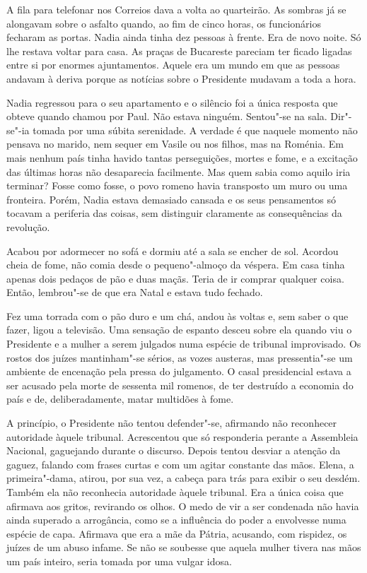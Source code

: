 A fila para telefonar nos Correios dava a volta ao quarteirão. As
sombras já se alongavam sobre o asfalto quando, ao fim de cinco horas,
os funcionários fecharam as portas. Nadia ainda tinha dez pessoas à
frente. Era de novo noite. Só lhe restava voltar para casa. As praças de
Bucareste pareciam ter ficado ligadas entre si por enormes ajuntamentos. Aquele era um mundo em que as pessoas andavam à deriva porque as
notícias sobre o Presidente mudavam a toda a hora.

Nadia regressou para o seu apartamento e o silêncio foi a única resposta
que obteve quando chamou por Paul. Não estava ninguém. Sentou"-se na
sala. Dir"-se"-ia tomada por uma súbita serenidade. A verdade é que
naquele momento não pensava no marido, nem sequer em Vasile ou nos
filhos, mas na Roménia. Em mais nenhum país tinha havido tantas
perseguições, mortes e fome, e a excitação das últimas horas não
desaparecia facilmente. Mas quem sabia como aquilo iria terminar? Fosse
como fosse, o povo romeno havia transposto um muro ou uma fronteira.
Porém, Nadia estava demasiado cansada e os seus pensamentos só tocavam a
periferia das coisas, sem distinguir claramente as consequências da
revolução.

Acabou por adormecer no sofá e dormiu até a sala se
encher de sol. Acordou cheia de fome, não comia desde o pequeno"-almoço
da véspera. Em casa tinha apenas dois
pedaços de pão e duas maçãs. Teria de ir comprar qualquer coisa. Então,
lembrou"-se de que era Natal e estava tudo fechado.

Fez uma torrada com o pão duro e um chá, andou às voltas e, sem saber o
que fazer, ligou a televisão. Uma sensação de espanto desceu sobre ela
quando viu o Presidente e a mulher a serem julgados numa espécie de
tribunal improvisado. Os rostos dos juízes mantinham"-se sérios, as
vozes austeras, mas pressentia"-se um ambiente de encenação pela pressa
do julgamento. O casal presidencial estava a ser acusado pela morte de
sessenta mil romenos, de ter destruído a economia do país e de,
deliberadamente, matar multidões à fome.

A princípio, o Presidente não tentou defender"-se, afirmando não
reconhecer autoridade àquele tribunal. Acrescentou que só responderia
perante a Assembleia Nacional, gaguejando durante o discurso. Depois
tentou desviar a atenção da gaguez, falando com frases curtas e com um
agitar constante das mãos. Elena, a primeira"-dama, atirou, por sua vez,
a cabeça para trás para exibir o seu desdém. Também ela não reconhecia
autoridade àquele tribunal. Era a única coisa que afirmava aos gritos,
revirando os olhos. O medo de vir a ser condenada não havia ainda
superado a arrogância, como se a influência do poder a envolvesse numa
espécie de capa. Afirmava que era a mãe da Pátria, acusando, com
rispidez, os juízes de um abuso infame. Se não se soubesse que aquela
mulher tivera nas mãos um país inteiro, seria tomada por uma vulgar
idosa.

